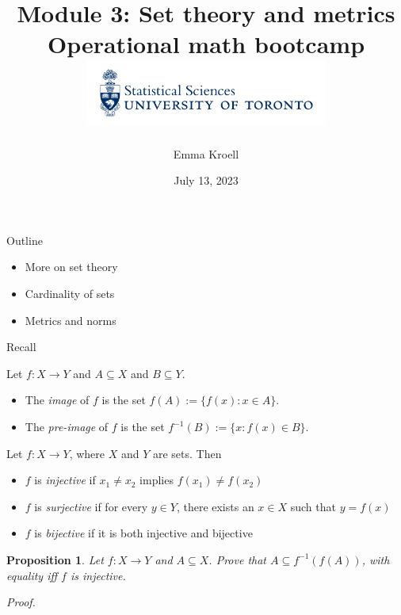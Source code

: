 \documentclass [aspectratio=169]{beamer}
\title[]{Module 3: Set theory and metrics \\ {\large Operational math bootcamp}\\ \includegraphics[width=8cm]{dept_logo.png}\vspace{-1em}}
\author[]{Emma Kroell}
\institute[]{University of Toronto}
\date{July 13,  2023}
\newtheorem{proposition}[theorem]{Proposition}
\begin{document}
{
\begin{frame}
    \titlepage
\end{frame}
}

\begin{frame}{Outline}
    \begin{itemize}
      \setlength\itemsep{1em}
    	\item More on set theory
	\item Cardinality of sets
	\item Metrics and norms
    \end{itemize}
\end{frame}

\begin{frame}{Recall}
\begin{definition}
Let $f:X \to Y$ and $A \subseteq X$ and $B \subseteq Y$. 
\begin{itemize}
\item The \emph{image} of $f$ is the set $f(A) := \{f(x): x \in A \}$.
\item The \emph{pre-image} of $f$ is the set $f^{-1}(B) := \{x: f(x) \in B \}$.
\end{itemize}
\end{definition}

\vspace{1em}


\begin{definition}
Let $f:X \to Y$, where $X$ and $Y$ are sets. Then
\begin{itemize}
    \item $f$ is \emph{injective} if $x_1 \neq x_2$ implies $f(x_1) \neq f(x_2)$
    \item $f$ is \emph{surjective} if for every $y \in Y$, there exists an $x \in X$ such that $y = f(x)$
    \item $f$ is \emph{bijective} if it is both injective and bijective
\end{itemize}
\end{definition}

\end{frame}

\begin{frame}
\begin{proposition}
Let $f: X \to Y$ and $A \subseteq X$. Prove that $A \subseteq f^{-1}(f(A))$, with equality iff $f$ is injective. 
\end{proposition}
\textit{Proof.}

\vspace{4.5cm}


\end{frame}
\end{document}
